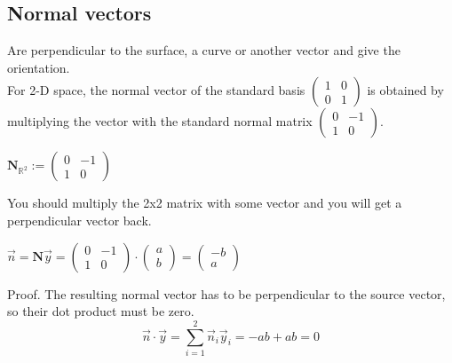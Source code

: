 \documentclass[a4paper]{article}
\begin{document}
\subsection{Normal vectors}

Are perpendicular to the surface, a curve or another vector and give the orientation.\\

For 2-D space, the normal vector of the standard basis $\begin{pmatrix}1&0\\0&1\end{pmatrix}$ is obtained by multiplying the vector with the standard normal matrix $\begin{pmatrix}0 & -1 \\ 1 & 0\end{pmatrix}$.\\

\begin{center}
$\boldsymbol{N}_{\mathbb{R}^{2}} := \begin{pmatrix}0 & -1 \\ 1 & 0\end{pmatrix}$\\
\end{center}

You should multiply the 2x2 matrix with some vector and you will get a perpendicular vector back.

\begin{center}
$\vec{n} = \boldsymbol{N}\vec{y} = \begin{pmatrix}0 & -1 \\ 1 & 0\end{pmatrix} \cdot \begin{pmatrix}a\\b\end{pmatrix} = \begin{pmatrix}-b\\a\end{pmatrix}$
\end{center}

Proof. The resulting normal vector has to be perpendicular to the source vector, so their dot product must be zero.\\



\begin{displaymath}
\vec{n} \cdot \vec{y} = \sum_{i=1}^{2}\vec{n}_{i}\vec{y}_i = -ab + ab = 0
\end{displaymath}
\end{document}
